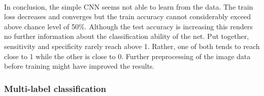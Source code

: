 \\
In conclusion, the simple CNN seems not able to learn from the data. The train loss decreases and converges but the train accuracy cannot considerably exceed above chance level of 50\%. Although the test accuracy is increasing this renders no further information about the classification ability of the net. Put together, sensitivity and specificity rarely reach above 1. Rather, one of both tends to reach close to 1 while the other is close to 0. Further preprocessing of the image data before training might have improved the results.



\subsubsection{Multi-label classification}
\label{subsec:MultiLabel}


